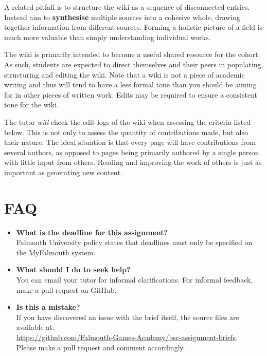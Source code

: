 \documentclass{../../fal_assignment}
\begin{document}
A related pitfall is to structure the wiki as a sequence of disconnected entries.
Instead aim to \textbf{synthesise} multiple sources into a cohesive whole,
drawing together information from different sources.
Forming a holistic picture of a field is much more valuable than simply understanding individual works.

The wiki is primarily intended to become a useful shared resource for the cohort.
As such, students are expected to direct themselves and their peers in populating, structuring and editing the wiki.
Note that a wiki is not a piece of academic writing
and thus will tend to have a less formal tone than you should be aiming for in other pieces of written work.
Edits may be required to ensure a consistent tone for the wiki.

The tutor \emph{will} check the edit logs of the wiki when assessing the criteria listed below.
This is not only to assess the quantity of contributions made,
but also their nature.
The ideal situation is that every page will have contributions from several authors,
as opposed to pages being primarily authored by a single person with little input from others.
Reading and improving the work of others is just as important as generating new content.

\section*{FAQ}

\begin{itemize}
	\item 	\textbf{What is the deadline for this assignment?} \\ 
    		Falmouth University policy states that deadlines must only be specified on the MyFalmouth system.
    		
	\item 	\textbf{What should I do to seek help?} \\ 
    		You can email your tutor for informal clarifications. For informal feedback, make a pull request on GitHub. 
    		
    	\item 	\textbf{Is this a mistake?} \\ 	
    		If you have discovered an issue with the brief itself, the source files are available at: \\
    		\url{https://github.com/Falmouth-Games-Academy/bsc-assignment-briefs}.\\
    		 Please make a pull request and comment accordingly.
\end{itemize}
\end{document}
